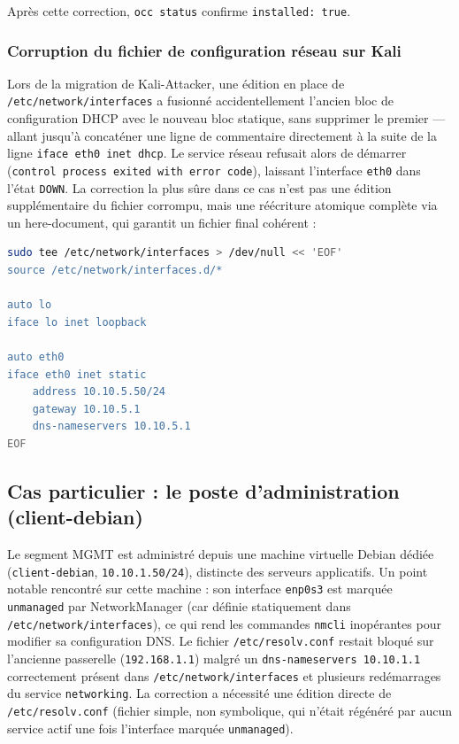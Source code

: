 Après cette correction, \texttt{occ status} confirme
\texttt{installed: true}.

\subsubsection{Corruption du fichier de configuration réseau sur Kali}

Lors de la migration de Kali-Attacker, une édition en place de
\texttt{/etc/network/interfaces} a fusionné accidentellement l'ancien bloc
de configuration DHCP avec le nouveau bloc statique, sans supprimer le
premier — allant jusqu'à concaténer une ligne de commentaire directement
à la suite de la ligne \texttt{iface eth0 inet dhcp}. Le service réseau
refusait alors de démarrer (\texttt{control process exited with error
code}), laissant l'interface \texttt{eth0} dans l'état \texttt{DOWN}. La
correction la plus sûre dans ce cas n'est pas une édition supplémentaire
du fichier corrompu, mais une réécriture atomique complète via un
here-document, qui garantit un fichier final cohérent :

\begin{lstlisting}[language=bash]
sudo tee /etc/network/interfaces > /dev/null << 'EOF'
source /etc/network/interfaces.d/*

auto lo
iface lo inet loopback

auto eth0
iface eth0 inet static
    address 10.10.5.50/24
    gateway 10.10.5.1
    dns-nameservers 10.10.5.1
EOF
\end{lstlisting}

\subsection{Cas particulier : le poste d'administration (client-debian)}

Le segment MGMT est administré depuis une machine virtuelle Debian
dédiée (\texttt{client-debian}, \texttt{10.10.1.50/24}), distincte des
serveurs applicatifs. Un point notable rencontré sur cette machine : son
interface \texttt{enp0s3} est marquée \texttt{unmanaged} par
NetworkManager (car définie statiquement dans
\texttt{/etc/network/interfaces}), ce qui rend les commandes
\texttt{nmcli} inopérantes pour modifier sa configuration DNS. Le fichier
\texttt{/etc/resolv.conf} restait bloqué sur l'ancienne passerelle
(\texttt{192.168.1.1}) malgré un \texttt{dns-nameservers 10.10.1.1}
correctement présent dans \texttt{/etc/network/interfaces} et plusieurs
redémarrages du service \texttt{networking}. La correction a nécessité une
édition directe de \texttt{/etc/resolv.conf} (fichier simple, non
symbolique, qui n'était régénéré par aucun service actif une fois
l'interface marquée \texttt{unmanaged}).

